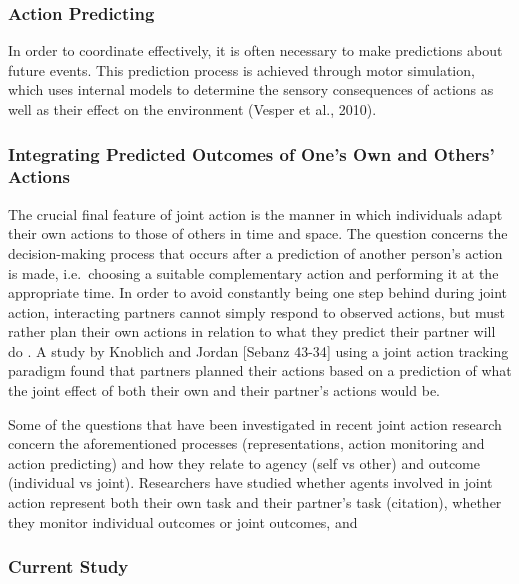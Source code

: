 \documentclass[10pt,a4paper,onecolumn]{article}
\begin{document}
\hypertarget{action-predicting}{%
\subsubsection{Action Predicting}\label{action-predicting}}

In order to coordinate effectively, it is often necessary to make predictions about future events. This prediction process is achieved through motor simulation, which uses internal models to determine the sensory consequences of actions as well as their effect on the environment (Vesper et al., 2010).

\hypertarget{integrating-predicted-outcomes-of-ones-own-and-others-actions}{%
\subsubsection{Integrating Predicted Outcomes of One's Own and Others' Actions}\label{integrating-predicted-outcomes-of-ones-own-and-others-actions}}

The crucial final feature of joint action is the manner in which individuals adapt their own actions to those of others in time and space. The question concerns the decision-making process that occurs after a prediction of another person's action is made, i.e.~choosing a suitable complementary action and performing it at the appropriate time. In order to avoid constantly being one step behind during joint action, interacting partners cannot simply respond to observed actions, but must rather plan their own actions in relation to what they predict their partner will do \autocite{sebanzJointActionBodies2006}. A study by Knoblich and Jordan {[}Sebanz 43-34{]} using a joint action tracking paradigm found that partners planned their actions based on a prediction of what the joint effect of both their own and their partner's actions would be.

Some of the questions that have been investigated in recent joint action research concern the aforementioned processes (representations, action monitoring and action predicting) and how they relate to agency (self vs other) and outcome (individual vs joint). Researchers have studied whether agents involved in joint action represent both their own task and their partner's task (citation), whether they monitor individual outcomes or joint outcomes, and

\hypertarget{current-study}{%
\subsubsection{Current Study}\label{current-study}}
\end{document}
